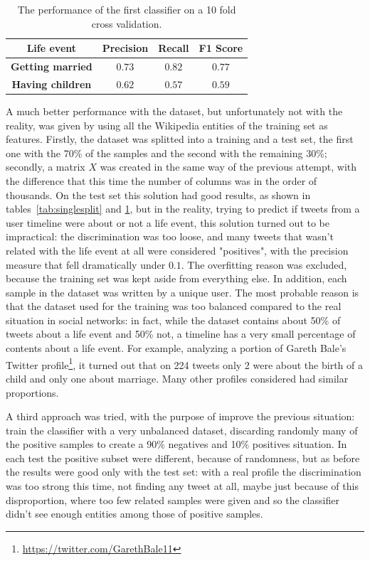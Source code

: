 \begin{table}
\begin{center}
\begin{tabular}{cccc}
\hline
Life event & Precision & Recall & F1 Score \\
\hline
\textbf{Getting married} & $0.73$ & $0.82$ & $0.77$ \\
\textbf{Having children} & $0.62$ & $0.57$ & $0.59$ \\
\hline
\end{tabular}
\end{center}
\caption{The performance of the first classifier on a 10 fold cross validation.}
\label{tab:kfold}
\end{table}

A much better performance with the dataset, but unfortunately not with the reality, was given by using all the Wikipedia entities of the training set as features. Firstly, the dataset was splitted into a training and a test set, the first one with the 70\% of the samples and the second with the remaining 30\%; secondly, a matrix $X$ was created in the same way of the previous attempt, with the difference that this time the number of columns was in the order of thousands. On the test set this solution had good results, as shown in tables~\ref{tab:singlesplit} and \ref{tab:kfold}, but in the reality, trying to predict if tweets from a user timeline were about or not a life event, this solution turned out to be impractical: the discrimination was too loose, and many tweets that wasn't related with the life event at all were considered "positives", with the precision measure that fell dramatically under $0.1$. The overfitting reason was excluded, because the training set was kept aside from everything else. In addition, each sample in the dataset was written by a unique user. The most probable reason is that the dataset used for the training was too balanced compared to the real situation in social networks: in fact, while the dataset contains about 50\% of tweets about a life event and 50\% not, a timeline has a very small percentage of contents about a life event. For example, analyzing a portion of Gareth Bale's Twitter profile\footnote{\url{https://twitter.com/GarethBale11}}, it turned out that on 224 tweets only 2 were about the birth of a child and only one about marriage. Many other profiles considered had similar proportions. 

A third approach was tried, with the purpose of improve the previous situation: train the classifier with a very unbalanced dataset, discarding randomly many of the positive samples to create a 90\% negatives and 10\% positives situation. In each test the positive subset were different, because of randomness, but as before the results were good only with the test set: with a real profile the discrimination was too strong this time, not finding any tweet at all, maybe just because of this disproportion, where too few related samples were given and so the classifier didn't see enough entities among those of positive samples.

